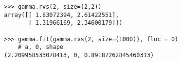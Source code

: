 \documentclass[MASTER.tex]{subfiles}
\begin{document}
\begin{frame}[fragile]	
	\begin{framed}
		\begin{verbatim}
		>>> gamma.rvs(2, size=(2,2))
		array([[ 1.83072394, 2.61422551],
		       [ 1.31966169, 2.34600179]])
		
		>>> gamma.fit(gamma.rvs(2, size=(1000)), floc = 0) 
		    # a, 0, shape
		(2.209958533078413, 0, 0.89187262845460313)
		\end{verbatim}
	\end{framed}
\end{frame}
\end{document}
